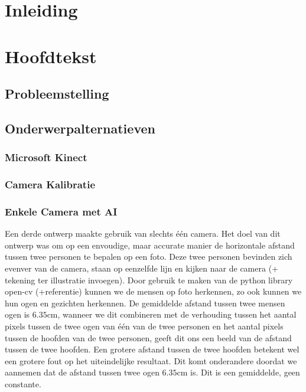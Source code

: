 \documentclass[a4paper,11pt]{article}
\begin{document}
	\begin{abstract}
		
	\end{abstract}
	
	
	
	\tableofcontents
	\newpage
	
	
	
	
	
	
	
	
	\section{Inleiding}
	\section{Hoofdtekst}
	\subsection{Probleemstelling}
	\subsection{Onderwerpalternatieven}
	\subsubsection{Microsoft Kinect}
	\subsubsection{Camera Kalibratie}
	\subsubsection{Enkele Camera met AI}
		Een derde ontwerp maakte gebruik van slechts één camera. Het doel van dit ontwerp was om op een envoudige, maar accurate manier de horizontale afstand tussen twee personen te bepalen op een foto. Deze twee personen bevinden zich evenver van de camera, staan op eenzelfde lijn en kijken naar de camera (+ tekening ter illustratie invoegen). Door gebruik te maken van de python library open-cv (+referentie) kunnen we de mensen op foto herkennen, zo ook kunnen we hun ogen en gezichten herkennen. De gemiddelde afstand tussen twee mensen ogen is $6.35\text{cm}$, wanneer we dit combineren met de verhouding tussen het aantal pixels tussen de twee ogen van één van de twee personen en het aantal pixels tussen de hoofden van de twee personen, geeft dit ons een beeld van de afstand tussen de twee hoofden. Een grotere afstand tussen de twee hoofden betekent wel een grotere fout op het uiteindelijke resultaat. Dit komt onderandere doordat we aannemen dat de afstand tussen twee ogen $6.35\text{cm}$ is. Dit is een gemiddelde, geen constante.
\end{document}
